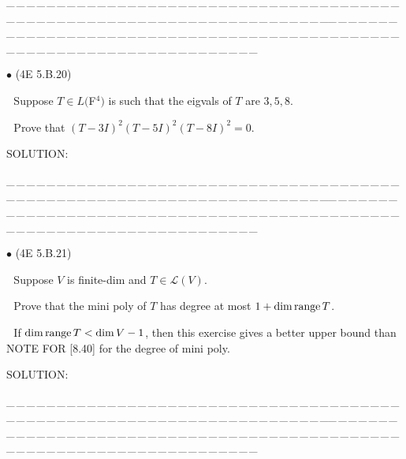 \documentclass[a4paper, 11pt, UTF8]{article}
\def\range{\textup{range}\,}
\def\Lm{\mathcal{L}}
\begin{document}
\begin{large}
\par
{\tiny \_\,\_\,\_\,\_\,\_\,\_\,\_\,\_\,\_\,\_\,\_\,\_\,\_\,\_\,\_\,\_\,\_\,\_\,\_\,\_\,\_\,\_\,\_\,\_\,\_\,\_\,\_\,\_\,\_\,\_\,\_\,\_\,\_\,\_\,\_\,\_\,\_\,\_\,\_\,\_\,\_\,\_\,\_\,\_\,\_\,\_\,\_\,\_\,\_\,\_\,\_\,\_\,\_\,\_\,\_\,\_\,\_\,\_\,\_\,\_\,\_\,\_\,\_\,\_\,\_\,\_\,\_\,\_\,\_\,\_\,\_\_\,\_\,\_\,\_\,\_\,\_\,\_\,\_\,\_\,\_\,\_\,\_\,\_\,\_\,\_\,\_\,\_\,\_\,\_\,\_\,\_\,\_\,\_\,\_\,\_\,\_\,\_\,\_\,\_\,\_\,\_\,\_\,\_\,\_\,\_\,\_\,\_\,\_\,\_\,\_\,\_\,\_\,\_\,\_\,\_\,\_\,\_\,\_\,\_\,\_\,\_\,\_\,\_\,\_\,\_\,\_\,\_\,\_\,\_\,\_\,\_\,\_\,\_\,\_\,\_\,\_\,\_\,\_\,\_\,\_\,\_}\par

{\small $\bullet$} (\normalsize{4E 5.B.20})\par\,\, {\timessl\Large 
Suppose $T\in L(${\timesbf F}$^4)$ is such that the eigvals of $T$ are $3, 5, 8$.}\par\,\,
{\timessl\Large Prove that
$(T - 3I)^2 (T - 5I)^2 (T - 8I)^2 = 0$.
}\par
{\timesbf S\footnotesize{OLUTION:}}\par\quad

\par
{\tiny \_\,\_\,\_\,\_\,\_\,\_\,\_\,\_\,\_\,\_\,\_\,\_\,\_\,\_\,\_\,\_\,\_\,\_\,\_\,\_\,\_\,\_\,\_\,\_\,\_\,\_\,\_\,\_\,\_\,\_\,\_\,\_\,\_\,\_\,\_\,\_\,\_\,\_\,\_\,\_\,\_\,\_\,\_\,\_\,\_\,\_\,\_\,\_\,\_\,\_\,\_\,\_\,\_\,\_\,\_\,\_\,\_\,\_\,\_\,\_\,\_\,\_\,\_\,\_\,\_\,\_\,\_\,\_\,\_\,\_\,\_\_\,\_\,\_\,\_\,\_\,\_\,\_\,\_\,\_\,\_\,\_\,\_\,\_\,\_\,\_\,\_\,\_\,\_\,\_\,\_\,\_\,\_\,\_\,\_\,\_\,\_\,\_\,\_\,\_\,\_\,\_\,\_\,\_\,\_\,\_\,\_\,\_\,\_\,\_\,\_\,\_\,\_\,\_\,\_\,\_\,\_\,\_\,\_\,\_\,\_\,\_\,\_\,\_\,\_\,\_\,\_\,\_\,\_\,\_\,\_\,\_\,\_\,\_\,\_\,\_\,\_\,\_\,\_\,\_\,\_\,\_}\par

{\small $\bullet$} (\normalsize{4E 5.B.21})\par\,\, {\timessl\Large 
Suppose $V$ is finite-dim and $T\in \Lm(V)$.}\par\,\,
{\timessl\Large Prove that the mini poly of $T$ has degree at most $1 + \dim \range T$.}\par\,\,
{\timessl\small
If $\dim \range T < \dim V - 1$, then this exercise gives a better upper bound than N{\scriptsize OTE} F{\scriptsize OR} [8.40] for the degree of mini poly.
}\par
{\timesbf S\footnotesize{OLUTION:}}\par\quad

\par
{\tiny \_\,\_\,\_\,\_\,\_\,\_\,\_\,\_\,\_\,\_\,\_\,\_\,\_\,\_\,\_\,\_\,\_\,\_\,\_\,\_\,\_\,\_\,\_\,\_\,\_\,\_\,\_\,\_\,\_\,\_\,\_\,\_\,\_\,\_\,\_\,\_\,\_\,\_\,\_\,\_\,\_\,\_\,\_\,\_\,\_\,\_\,\_\,\_\,\_\,\_\,\_\,\_\,\_\,\_\,\_\,\_\,\_\,\_\,\_\,\_\,\_\,\_\,\_\,\_\,\_\,\_\,\_\,\_\,\_\,\_\,\_\_\,\_\,\_\,\_\,\_\,\_\,\_\,\_\,\_\,\_\,\_\,\_\,\_\,\_\,\_\,\_\,\_\,\_\,\_\,\_\,\_\,\_\,\_\,\_\,\_\,\_\,\_\,\_\,\_\,\_\,\_\,\_\,\_\,\_\,\_\,\_\,\_\,\_\,\_\,\_\,\_\,\_\,\_\,\_\,\_\,\_\,\_\,\_\,\_\,\_\,\_\,\_\,\_\,\_\,\_\,\_\,\_\,\_\,\_\,\_\,\_\,\_\,\_\,\_\,\_\,\_\,\_\,\_\,\_\,\_\,\_}\par


\end{large}
\end{document}
